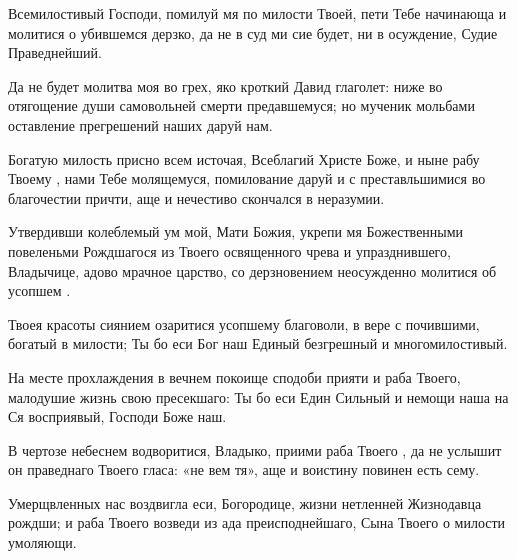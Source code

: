 \begin{mymulticols}


Всемилостивый Господи, помилуй мя по милости Твоей, пети Тебе начинающа и молитися о убившемся дерзко, да не в суд ми сие будет, ни в осуждение, Судие Праведнейший.




Да не будет молитва моя во грех, яко кроткий Давид глаголет: ниже во отягощение души самовольней смерти предавшемуся; но мученик мольбами оставление прегрешений наших даруй нам.


\slava


Богатую милость присно всем источая, Всеблагий Христе Боже, и ныне рабу Твоему , нами Тебе молящемуся, помилование даруй и с преставльшимися во благочестии причти, аще и нечестиво скончался в неразумии.


\inyne


Утвердивши колеблемый ум мой, Мати Божия, укрепи мя Божественными повеленьми Рождшагося из Твоего освященного чрева и упразднившего, Владычице, адово мрачное царство, со дерзновением неосужденно молитися об усопшем . 







Твоея красоты сиянием озаритися усопшему благоволи, в вере с почившими, богатый в милости; Ты бо еси Бог наш Единый безгрешный и многомилостивый.




На месте прохлаждения в вечнем покоище сподоби прияти и раба Твоего, малодушие жизнь свою пресекшаго: Ты бо еси Един Сильный и немощи наша на Ся восприявый, Господи Боже наш.


\slava


В чертозе небеснем водворитися, Владыко, приими раба Твоего , да не услышит он праведнаго Твоего гласа: «не вем тя», аще и воистину повинен есть сему.


\inyne


Умерщвленных нас воздвигла еси, Богородице, жизни нетленней Жизнодавца рождши; и раба Твоего  возведи из ада преисподнейшаго, Сына Твоего о милости умоляющи. 



\end{mymulticols}
